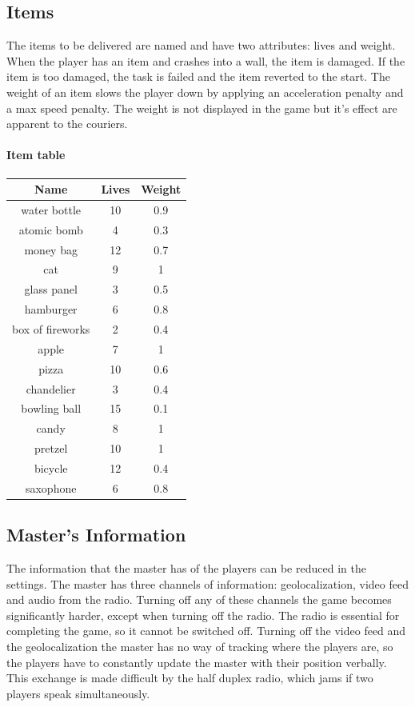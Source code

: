 \documentclass[12pt]{article}
\begin{document}
\subsection{Items}
The items to be delivered are named and have two attributes: lives and weight. When the player has an item and crashes into a wall, the item is damaged. If the item is too damaged, the task is failed and the item reverted to the start. The weight of an item slows the player down by applying an acceleration penalty and a max speed penalty. The weight is not displayed in the game but it's effect are apparent to the couriers.

\paragraph{Item table}

\begin{center}
\begin{tabular}{ |c|c|c| } 
 \hline
 Name & Lives & Weight \\ 
\hline
water bottle & 10 & 0.9\\
atomic bomb & 4 & 0.3\\
money bag & 12 & 0.7\\
cat & 9 & 1\\
glass panel & 3 & 0.5\\
hamburger & 6 & 0.8\\
box of fireworks & 2 & 0.4\\
apple & 7 & 1\\
pizza & 10 & 0.6\\
chandelier & 3 & 0.4\\
bowling ball & 15 & 0.1\\
candy & 8 & 1\\
pretzel & 10 & 1\\
bicycle & 12 & 0.4\\
saxophone & 6 & 0.8\\
 \hline
\end{tabular}
\end{center}

\subsection{Master's Information}
The information that the master has of the players can be reduced in the settings. The master has three channels of information: geolocalization, video feed and audio from the radio. Turning off any of these channels the game becomes significantly harder, except when turning off the radio. The radio is essential for completing the game, so it cannot be switched off. Turning off the video feed and the geolocalization the master has no way of tracking where the players are, so the players have to constantly update the master with their position verbally. This exchange is made difficult by the half duplex radio, which jams if two players speak simultaneously.
\end{document}
